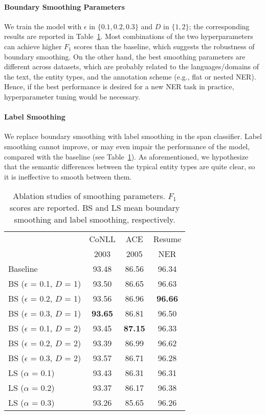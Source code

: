 \documentclass[11pt]{article}
\begin{document}
\paragraph{Boundary Smoothing Parameters} We train the model with $\epsilon$ in $\{0.1, 0.2, 0.3\}$ and $D$ in $\{1, 2\}$; the corresponding results are reported in Table~\ref{tab:ablation-parameters}. Most combinations of the two hyperparameters can achieve higher $F_1$ scores than the baseline, which suggests the robustness of boundary smoothing. On the other hand, the best smoothing parameters are different across datasets, which are probably related to the languages/domains of the text, the entity types, and the annotation scheme (e.g., flat or nested NER). Hence, if the best performance is desired for a new NER task in practice, hyperparameter tuning would be necessary. 

\paragraph{Label Smoothing} We replace boundary smoothing with label smoothing in the span classifier. Label smoothing cannot improve, or may even impair the performance of the model, compared with the baseline (see Table~\ref{tab:ablation-parameters}). As aforementioned, we hypothesize that the semantic differences between the typical entity types are quite clear, so it is ineffective to smooth between them. 

\begin{table}[t]
    \centering \small
    \begin{tabular}{lccc}
        \toprule
         & CoNLL & ACE  & Resume \\
         & 2003  & 2005 & NER \\
        \midrule
        Baseline          & 93.48 & 86.56 & 96.34 \\
        \midrule
        BS ($\epsilon$ = 0.1, $D$ = 1) & 93.50 & 86.65 & 96.63 \\
        BS ($\epsilon$ = 0.2, $D$ = 1) & 93.56 & 86.96 & \textbf{96.66} \\
        BS ($\epsilon$ = 0.3, $D$ = 1) & \textbf{93.65} & 86.81 & 96.50 \\
        BS ($\epsilon$ = 0.1, $D$ = 2) & 93.45 & \textbf{87.15} & 96.33 \\
        BS ($\epsilon$ = 0.2, $D$ = 2) & 93.39 & 86.99 & 96.62 \\
        BS ($\epsilon$ = 0.3, $D$ = 2) & 93.57 & 86.71 & 96.28 \\
        \midrule
        LS ($\alpha$ = 0.1) & 93.43 & 86.31 & 96.31 \\
        LS ($\alpha$ = 0.2) & 93.37 & 86.17 & 96.38 \\
        LS ($\alpha$ = 0.3) & 93.26 & 85.65 & 96.26 \\
        \bottomrule
    \end{tabular}
    \caption{Ablation studies of smoothing parameters. $F_1$ scores are reported. BS and LS mean boundary smoothing and label smoothing, respectively.}
    \label{tab:ablation-parameters}
\end{table}
\end{document}
